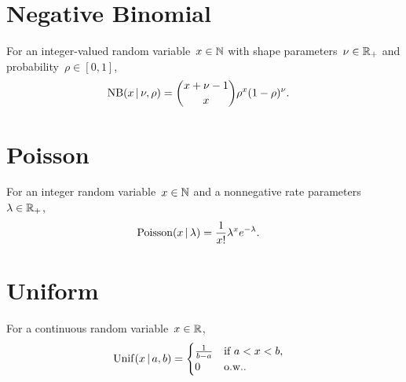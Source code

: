 \section*{Negative Binomial}
For an integer-valued random variable~${x \in \mathbb{N}}$
with shape parameters~${\nu \in \mathbb{R}_+}$
and probability~${\rho \in [0,1]}$,
\begin{align*}
  \mathrm{NB}(x \,|\, \nu, \rho)
  &= {x + \nu - 1 \choose x} \rho^x (1-\rho)^{\nu}.
\end{align*}


\section*{Poisson}
For an integer random variable~$x \in \mathbb{N}$ and a
nonnegative rate parameters~$\lambda \in \mathbb{R}_+$,
\begin{align*}
  \mathrm{Poisson}(x \,|\, \lambda)
  &= \frac{1}{x!} \lambda^x e^{-\lambda}.
\end{align*}

\section*{Uniform}
For a continuous random variable~$x \in \mathbb{R}$,
\begin{align*}
  \mathrm{Unif}(x \,|\, a, b)
  &=
  \begin{cases}
    \frac{1}{b-a} & \text{if } a < x < b, \\
    0 & \text{o.w.}.
  \end{cases}
\end{align*}

